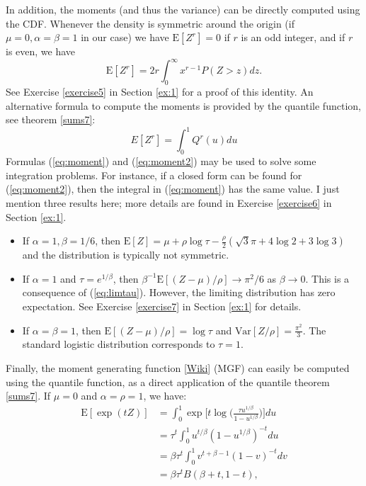\documentclass[10pt]{article}
\begin{document}
In addition, the moments (and thus the variance) can be directly computed using the CDF. Whenever the density is symmetric around the origin (if $\mu=0,\alpha=\beta=1$ in our case)  we have $\mbox{E}[Z^r]=0$ if $r$ is an odd integer, and if $r$ is even, we have
\begin{equation}
\mbox{E}[Z^r]=2r\int_0^\infty x^{r-1} P(Z>z)dz. \label{eq:moment}
\end{equation}
See Exercise \ref{exercise5} in Section \ref{ex:1} for a proof of this identity.  An alternative formula to compute the moments is provided by the quantile function, see theorem \ref{sums7}:
\begin{equation}
E[Z^r]=\int_0^1  Q^r(u)du \label{eq:moment2}
\end{equation}
Formulas (\ref{eq:moment}) and (\ref{eq:moment2}) may be used to solve some integration problems. For instance, if a closed form can be found for (\ref{eq:moment2}), then the integral in (\ref{eq:moment}) has the same value. I just mention three results here; more details are found in Exercise \ref{exercise6} in Section \ref{ex:1}.
\begin{itemize}
\item If $\alpha=1,\beta=1/6$, then $\mbox{E}[Z]=\mu+\rho\log\tau -\frac{\rho}{2}(\sqrt{3}\pi +4\log 2 +3\log 3)$ and the distribution is typically not symmetric.
\item If $\alpha=1$ and $\tau=e^{1/\beta}$, then $\beta^{-1}\mbox{E}[(Z-\mu)/\rho]\rightarrow \pi^2/6$ as  $\beta\rightarrow 0$. This is a consequence of (\ref{eq:limtau}). However, the limiting distribution has zero expectation. See Exercise \ref{exercise7} in Section \ref{ex:1} for details.
\item If $\alpha=\beta=1$, then $\mbox{E}[(Z-\mu)/\rho]=\log\tau$ and $\mbox{Var}[Z/\rho]=\frac{\pi^2}{3}$. The standard logistic distribution corresponds to $\tau=1$.
\end{itemize}
Finally, the \textcolor{index}{moment generating function} [\href{https://en.wikipedia.org/wiki/Moment-generating_function}{Wiki}] (MGF)  can easily be computed using the quantile function, as a direct application of the \textcolor{index}{quantile theorem} \ref{sums7}. If $\mu=0$ and $\alpha=\rho=1$, we have:
\begin{align}
\mbox{E}[\exp(tZ)] & =\int_0^1 \exp\Big[t\log\Big(\frac{\tau u^{1/\beta}}{1-u^{1/\beta}}\Big)\Big]  du\nonumber \\
    & = \tau^t \int_0^1 u^{t/\beta}(1-u^{1/\beta})^{-t} du \nonumber \\
   & = \beta\tau^t \int_0^1 v^{t+\beta-1}(1-v)^{-t}dv\nonumber \\
  & = \beta\tau^{t}B(\beta+t,1-t) \label{eq:qt},
\end{align}
\end{document}
